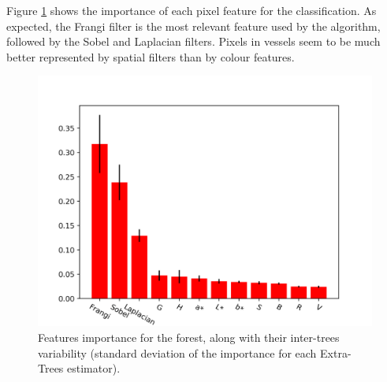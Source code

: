 Figure \ref{fig:importance} shows the importance of each pixel feature for the classification. As expected, the Frangi filter is the most relevant feature used by the algorithm, followed by the Sobel and Laplacian filters. Pixels in vessels seem to be much better represented by spatial filters than by colour features.

\begin{figure}
  \includegraphics[width=\textwidth]{figures/importances}
  \caption{Features importance for the forest, along with their inter-trees variability (standard deviation of the importance for each Extra-Trees estimator).} \label{fig:importance}
\end{figure}
